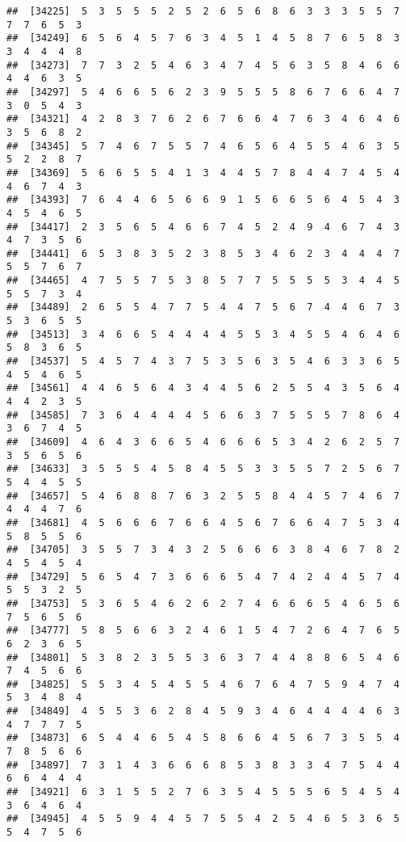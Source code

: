 \documentclass[
]{book}
\begin{document}
\begin{verbatim}
##  [34225]  5  3  5  5  5  2  5  2  6  5  6  8  6  3  3  3  5  5  7  7  7  6  5  3
##  [34249]  6  5  6  4  5  7  6  3  4  5  1  4  5  8  7  6  5  8  3  3  4  4  4  8
##  [34273]  7  7  3  2  5  4  6  3  4  7  4  5  6  3  5  8  4  6  6  4  4  6  3  5
##  [34297]  5  4  6  6  5  6  2  3  9  5  5  5  8  6  7  6  6  4  7  3  0  5  4  3
##  [34321]  4  2  8  3  7  6  2  6  7  6  6  4  7  6  3  4  6  4  6  3  5  6  8  2
##  [34345]  5  7  4  6  7  5  5  7  4  6  5  6  4  5  5  4  6  3  5  5  2  2  8  7
##  [34369]  5  6  6  5  5  4  1  3  4  4  5  7  8  4  4  7  4  5  4  4  6  7  4  3
##  [34393]  7  6  4  4  6  5  6  6  9  1  5  6  6  5  6  4  5  4  3  4  5  4  6  5
##  [34417]  2  3  5  6  5  4  6  6  7  4  5  2  4  9  4  6  7  4  3  4  7  3  5  6
##  [34441]  6  5  3  8  3  5  2  3  8  5  3  4  6  2  3  4  4  4  7  5  5  7  6  7
##  [34465]  4  7  5  5  7  5  3  8  5  7  7  5  5  5  5  3  4  4  5  5  5  7  3  4
##  [34489]  2  6  5  5  4  7  7  5  4  4  7  5  6  7  4  4  6  7  3  5  3  6  5  5
##  [34513]  3  4  6  6  5  4  4  4  4  5  5  3  4  5  5  4  6  4  6  5  8  3  6  5
##  [34537]  5  4  5  7  4  3  7  5  3  5  6  3  5  4  6  3  3  6  5  4  5  4  6  5
##  [34561]  4  4  6  5  6  4  3  4  4  5  6  2  5  5  4  3  5  6  4  4  4  2  3  5
##  [34585]  7  3  6  4  4  4  4  5  6  6  3  7  5  5  5  7  8  6  4  3  6  7  4  5
##  [34609]  4  6  4  3  6  6  5  4  6  6  6  5  3  4  2  6  2  5  7  3  5  6  5  6
##  [34633]  3  5  5  5  4  5  8  4  5  5  3  3  5  5  7  2  5  6  7  5  4  4  5  5
##  [34657]  5  4  6  8  8  7  6  3  2  5  5  8  4  4  5  7  4  6  7  4  4  4  7  6
##  [34681]  4  5  6  6  6  7  6  6  4  5  6  7  6  6  4  7  5  3  4  5  8  5  5  6
##  [34705]  3  5  5  7  3  4  3  2  5  6  6  6  3  8  4  6  7  8  2  4  5  4  5  4
##  [34729]  5  6  5  4  7  3  6  6  6  5  4  7  4  2  4  4  5  7  4  5  5  3  2  5
##  [34753]  5  3  6  5  4  6  2  6  2  7  4  6  6  6  5  4  6  5  6  7  5  6  5  6
##  [34777]  5  8  5  6  6  3  2  4  6  1  5  4  7  2  6  4  7  6  5  6  2  3  6  5
##  [34801]  5  3  8  2  3  5  5  3  6  3  7  4  4  8  8  6  5  4  6  7  4  5  6  6
##  [34825]  5  5  3  4  5  4  5  5  4  6  7  6  4  7  5  9  4  7  4  5  3  4  8  4
##  [34849]  4  5  5  3  6  2  8  4  5  9  3  4  6  4  4  4  4  6  3  4  7  7  7  5
##  [34873]  6  5  4  4  6  5  4  5  8  6  6  4  5  6  7  3  5  5  4  7  8  5  6  6
##  [34897]  7  3  1  4  3  6  6  6  8  5  3  8  3  3  4  7  5  4  4  6  6  4  4  4
##  [34921]  6  3  1  5  5  2  7  6  3  5  4  5  5  5  6  5  4  5  4  3  6  4  6  4
##  [34945]  4  5  5  9  4  4  5  7  5  5  4  2  5  4  6  5  3  6  5  5  4  7  5  6

\end{verbatim}
\end{document}
